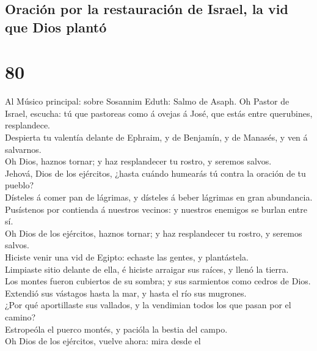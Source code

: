 \hypertarget{oraciuxf3n-por-la-restauraciuxf3n-de-israel-la-vid-que-dios-plantuxf3}{%
\subsection{Oración por la restauración de Israel, la vid que Dios
plantó}\label{oraciuxf3n-por-la-restauraciuxf3n-de-israel-la-vid-que-dios-plantuxf3}}

\hypertarget{section-19-80}{%
\section{80}\label{section-19-80}}

 Al Músico principal: sobre Sosannim Eduth: Salmo de
Asaph. Oh Pastor de Israel, escucha: tú que pastoreas como á ovejas á
José, que estás entre querubines, resplandece.\\
 Despierta tu valentía delante de Ephraim, y de Benjamín,
y de Manasés, y ven á salvarnos.\\
 Oh Dios, haznos tornar; y haz resplandecer tu rostro, y
seremos salvos.\\
 Jehová, Dios de los ejércitos, ¿hasta cuándo humearás tú
contra la oración de tu pueblo?\\
 Dísteles á comer pan de lágrimas, y dísteles á beber
lágrimas en gran abundancia.\\
 Pusístenos por contienda á nuestros vecinos: y nuestros
enemigos se burlan entre sí.\\
 Oh Dios de los ejércitos, haznos tornar; y haz
resplandecer tu rostro, y seremos salvos.\\
 Hiciste venir una vid de Egipto: echaste las gentes, y
plantástela.\\
 Limpiaste sitio delante de ella, é hiciste arraigar sus
raíces, y llenó la tierra.\\
 Los montes fueron cubiertos de su sombra; y sus
sarmientos como cedros de Dios.\\
 Extendió sus vástagos hasta la mar, y hasta el río sus
mugrones.\\
 ¿Por qué aportillaste sus vallados, y la vendimian todos
los que pasan por el camino?\\
 Estropeóla el puerco montés, y pacióla la bestia del
campo.\\
 Oh Dios de los ejércitos, vuelve ahora: mira desde el
